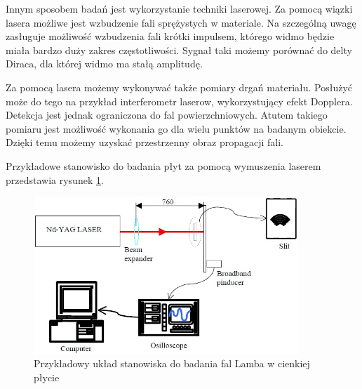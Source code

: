 Innym sposobem badań jest wykorzystanie techniki laserowej. Za pomocą wiązki lasera możliwe jest wzbudzenie fali sprężystych w materiale. Na szczególną uwagę zasługuje możliwość wzbudzenia fali krótki impulsem, którego widmo będzie miała bardzo duży zakres częstotliwości. Sygnał taki możemy porównać do delty Diraca, dla której widmo ma stałą amplitudę. 

Za pomocą lasera możemy wykonywać także pomiary drgań materiału. Posłużyć może do tego na przykład interferometr laserow, wykorzystujący efekt Dopplera. Detekcja jest jednak ograniczona do fal powierzchniowych. Atutem takiego pomiaru jest możliwość wykonania go dla wielu punktów na badanym obiekcie. Dzięki temu możemy uzyskać przestrzenny obraz propagacji fali.

Przykładowe stanowisko do badania płyt za pomocą wymuszenia laserem przedstawia rysunek \ref{fig:laser}.

\begin{figure}[h]
\centering
\includegraphics[width=10cm]{Zdjecia/2/laser}
\caption{Przykładowy układ stanowiska do badania fal Lamba w cienkiej płycie}
\label{fig:laser}
\end{figure}























